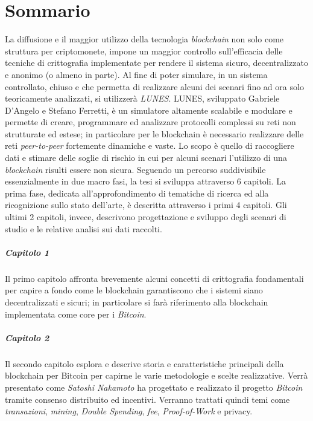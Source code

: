 \chapter*{Sommario}
La diffusione e il maggior utilizzo della tecnologia \textit{blockchain} non solo come struttura per criptomonete, impone un maggior controllo sull'efficacia delle tecniche di crittografia implementate per rendere il sistema sicuro, decentralizzato e anonimo (o almeno in parte).\newline
Al fine di poter simulare, in un sistema controllato, chiuso e che permetta di realizzare alcuni dei scenari fino ad ora solo teoricamente analizzati, si utilizzerà \textit{LUNES}\cite{gdalunes}.\newline
LUNES, sviluppato Gabriele D'Angelo e Stefano Ferretti, è un simulatore altamente scalabile e modulare e permette di creare, programmare ed analizzare protocolli complessi su reti non strutturate ed estese; in particolare per le blockchain è necessario realizzare delle reti \textit{peer-to-peer} fortemente dinamiche e vaste.\newline
Lo scopo è quello di raccogliere dati e stimare delle soglie di rischio in cui per alcuni scenari l'utilizzo di una \textit{blockchain} risulti essere non sicura.\newline\newline
Seguendo un percorso suddivisibile essenzialmente in due macro fasi, la tesi si sviluppa attraverso 6 capitoli. La prima fase, dedicata all'approfondimento di tematiche di ricerca ed alla ricognizione sullo stato dell'arte, è descritta attraverso i primi 4 capitoli. Gli ultimi 2 capitoli, invece, descrivono progettazione e sviluppo degli scenari di studio e le relative analisi sui dati raccolti.

\paragraph{Capitolo 1}
Il primo capitolo affronta brevemente alcuni concetti di crittografia fondamentali per capire a fondo come le blockchain garantiscono che i sistemi siano decentralizzati e sicuri; in particolare si farà riferimento alla blockchain implementata come core per i \textit{Bitcoin}.

\paragraph{Capitolo 2}
Il secondo capitolo esplora e descrive storia e caratteristiche principali della blockchain per Bitcoin per capirne le varie metodologie e scelte realizzative. Verrà presentato come \textit{Satoshi Nakamoto} ha progettato e realizzato il progetto \textit{Bitcoin} tramite consenso distribuito ed incentivi. Verranno trattati quindi temi come \textit{transazioni}, \textit{mining}, \textit{Double Spending}, \textit{fee}, \textit{Proof-of-Work} e privacy.

